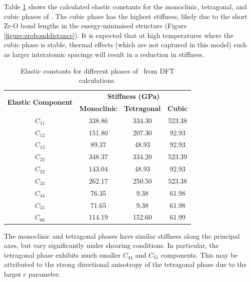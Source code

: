 Table \ref{stiffness_tensor} shows the calculated elastic constants for the monoclinic, tetragonal, and cubic phases of \zirconia . The cubic phase has the highest stiffness, likely due to the short Zr-O bond lengths in the energy-minimised structure (Figure \ref{figure:zrobonddistance}). It is expected that at high temperatures where the cubic phase is stable, thermal effects (which are not captured in this model) such as larger interatomic spacings will result in a reduction in stiffness.

\begin{table}[ht] %
\onehalfspacing
\centering
\caption{Elastic constants for different phases of \zirconia\ from DFT calculations.}
\label{stiffness_tensor}
\begin{tabular}{cccc}
\hline
\multirow{2}{*}{\textbf{Elastic Component}} & \multicolumn{3}{c}{\textbf{Stiffness (GPa)}}               \\ \cline{2-4} 
                                            & \textbf{Monoclinic} & \textbf{Tetragonal} & \textbf{Cubic} \\ \hline
$C_{11}$                                         & 338.86        & 334.30               & 523.38    \\
$C_{12}$                                         & 151.80        & 207.30               & 92.93     \\
$C_{13}$                                         & 89.37         & 48.93               & 92.93     \\
$C_{22}$                                         & 348.37        & 334.20               & 523.39    \\
$C_{23}$                                         & 143.04        & 48.93               & 92.93    \\
$C_{33}$                                         & 262.17        & 250.50               & 523.38   \\
$C_{44}$                                         & 76.35         & 9.38                & 61.98    \\
$C_{55}$                                         & 71.65         & 9.38                & 61.98   \\
$C_{66}$                                         & 114.19        & 152.60               & 61.99     \\ \hline
\end{tabular}
\end{table}

The monoclinic and tetragonal phases have similar stiffness along the principal axes, but vary significantly under shearing conditions. In particular, the tetragonal phase exhibits much smaller $C_{44}$ and $C_{55}$ components. This may be attributed to the strong directional anisotropy of the tetragonal phase due to the larger $c$ parameter. 

